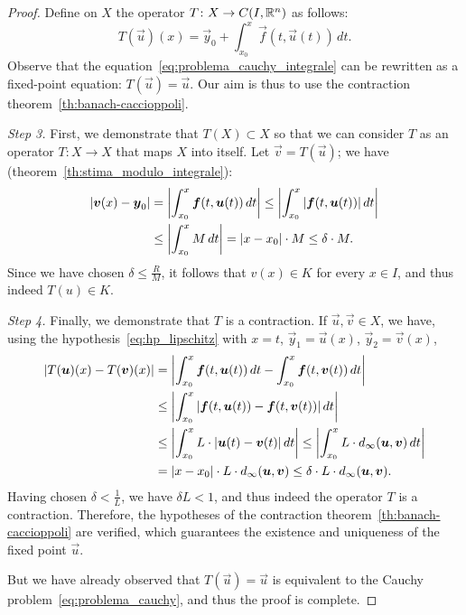 \begin{proof}
  Define on $X$ the operator $T\colon X \to C(I,{\mathbb R}^n)$ as follows:
  \[
    T(\vec u)(x) = \vec y_0 + \int_{x_0}^x \vec f(t,\vec u(t))\, dt.
  \]
    Observe that the equation~\eqref{eq:problema_cauchy_integrale} can be
  rewritten as a fixed-point equation: $T(\vec u) = \vec u$. Our aim is thus to
  use the contraction theorem~\ref{th:banach-caccioppoli}.

  \emph{Step 3.}
    First, we demonstrate that $T(X)\subset X$ so that we can consider $T$ as an
  operator $T\colon X\to X$ that maps $X$ into itself. Let $\vec v = T(\vec u)$;
  we have (theorem~\ref{th:stima_modulo_integrale}):
  \begin{align*}
    {\left|\boldsymbol v(x)-\boldsymbol y_0\right|} 
    &= {\left|\int_{x_0}^x \boldsymbol f(t, \boldsymbol u(t))\, dt\right|} 
    \le {\left|\int_{x_0}^x {\left|\boldsymbol f(t,\boldsymbol u(t))\right|}\, dt\right|}\\
    &\le {\left|\int_{x_0}^x M\, dt \right|} 
    = {\left|x-x_0\right|}\cdot M \le \delta \cdot M.
  \end{align*}
Since we have chosen $\delta \le \frac{R}{M}$, it follows that $v(x) \in K$ for
every $x\in I$, and thus indeed $T(u)\in K$.

\emph{Step 4.}
Finally, we demonstrate that $T$ is a contraction. If $\vec u,\vec v\in X$, we
have, using the hypothesis~\eqref{eq:hp_lipschitz} with $x=t$, $\vec y_1=\vec
u(x)$, $\vec y_2 = \vec v(x)$,
\begin{align*}
{\left|T(\boldsymbol u)(x)-T(\boldsymbol v)(x)\right|} 
    &= {\left|\int_{x_0}^x \boldsymbol f(t,\boldsymbol u(t))\, dt - \int_{x_0}^x \boldsymbol f(t,\boldsymbol v(t))\, dt\right|} \\
  &\le {\left|\int_{x_0}^x {\left|\boldsymbol f(t,\boldsymbol u(t))- \boldsymbol f(t,\boldsymbol v(t))\right|}\, dt \right|}\\
  &\le {\left|\int_{x_0}^x L\cdot  {\left|\boldsymbol u(t) - \boldsymbol v(t)\right|}\, dt\right|} 
  \le {\left|\int_{x_0}^x L \cdot d_\infty(\boldsymbol u, \boldsymbol v)\, dt\right|}  \\
  &={\left|x-x_0\right|}\cdot L \cdot d_\infty(\boldsymbol u,\boldsymbol v)
  \le \delta \cdot L \cdot d_\infty(\boldsymbol u,\boldsymbol v).
\end{align*}
Having chosen $\delta < \frac{1}{L}$, we have $\delta L<1$, and thus indeed the
operator $T$ is a contraction. Therefore, the hypotheses of the contraction
theorem~\ref{th:banach-caccioppoli} are verified, which guarantees the existence
and uniqueness of the fixed point $\vec u$.

But we have already observed that $T(\vec u) = \vec u$ is equivalent to the
Cauchy problem~\eqref{eq:problema_cauchy}, and thus the proof is complete.
\end{proof}

